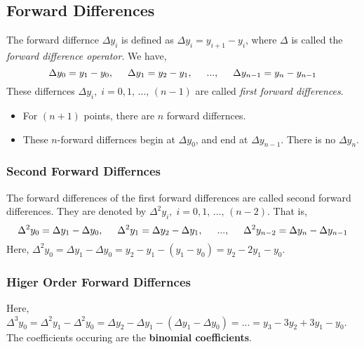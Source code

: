 \documentclass[aima203_lecturenotes_ku.tex]{subfiles}
\begin{document}
\subsection{Forward Differences}
The forward differnce $\Delta y_i$ is defined as $\Delta y_i = y_{i+1} - y_i$, where $\Delta$ is called the \textit{forward difference operator}. We have,
\begin{equation}
  \label{forward}
  \Delta y_0 = y_1 - y_0, \hspace{5mm} \Delta y_1 = y_2 - y_1, \hspace{5mm} ..., \hspace{5mm} \Delta y_{n-1} = y_{n} - y_{n-1}
\end{equation}
These differnces $\Delta y_i, \; i=0,1,\, ..., \, (n-1)$ are called \textit{first forward differences}.
\begin{itemize}
\item For $(n+1)$ points, there are $n$ forward differnces.
\item These $n$-forward differnces begin at $\Delta y_0$, and end at $\Delta y_{n-1}$. There is no $\Delta y_n$.
\end{itemize}

\subsubsection{Second Forward Differnces}
The forward differences of the first forward differences are called second forward differences. They are denoted by $\Delta ^2 y_i, \; i=0,1,\, ..., \, (n-2)$. That is,
\begin{equation}
  \label{forward2}
  \Delta ^2 y_0 = \Delta y_1 - \Delta y_0, \hspace{5mm} \Delta ^2 y_1 = \Delta y_2 - \Delta y_1, \hspace{5mm} ..., \hspace{5mm} \Delta ^2 y_{n-2} = \Delta y_{n} - \Delta y_{n-1}
\end{equation}
Here, $\Delta ^2 y_0 = \Delta y_1 - \Delta y_0 = y_2 - y_1 - (y_1 - y_0) = y_2 -2y_1 - y_0$.

\subsubsection{Higer Order Forward Differnces}
Here, $\Delta ^3 y_0 = \Delta ^2 y_1 - \Delta ^2 y_0 = \Delta y_2 - \Delta y_1-(\Delta y_1 - \Delta y_0) = ... = y_3 - 3y_2 + 3y_1- y_0$. \\
The coefficients occuring are the \textbf{binomial coefficients}.
\end{document}

